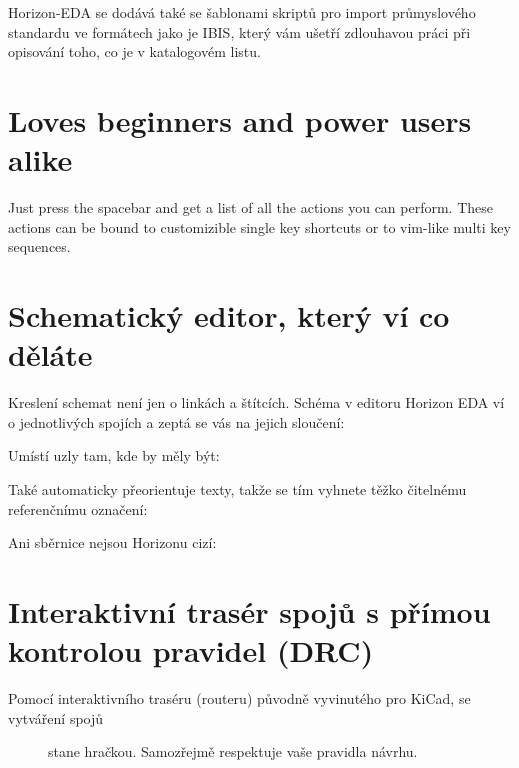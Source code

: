 \documentclass[letterpaper,10pt,czech]{sphinxmanual}
\begin{document}
\noindent{}

Horizon-EDA se dodává také se šablonami skriptů pro import průmyslového standardu
ve formátech jako je IBIS, který vám ušetří zdlouhavou práci při opisování toho, co je v katalogovém listu.


\section{Loves beginners and power users alike}
\label{\detokenize{feature-overview:loves-beginners-and-power-users-alike}}
Just press the spacebar and get a list of all the actions you can perform. These actions can be bound to customizible single key shortcuts or to vim-like multi key sequences.

\noindent{}


\section{Schematický editor, který ví co děláte}
\label{\detokenize{feature-overview:schematicky-editor-ktery-vi-co-delate}}
Kreslení schemat není jen o linkách a štítcích. Schéma v editoru Horizon EDA
ví o jednotlivých spojích a zeptá se vás na jejich sloučení:

\noindent{}

Umístí uzly tam, kde by měly být:

\noindent{}

Také automaticky přeorientuje texty, takže se tím vyhnete
těžko čitelnému referenčnímu označení:

\noindent{}

Ani sběrnice nejsou Horizonu cizí:

\noindent{}


\section{Interaktivní trasér spojů s přímou kontrolou pravidel (DRC)}
\label{\detokenize{feature-overview:interaktivni-traser-spoju-s-primou-kontrolou-pravidel-drc}}\begin{description}
\item[{Pomocí interaktivního traséru (routeru) původně vyvinutého pro KiCad, se vytváření spojů}] \leavevmode
stane hračkou. Samozřejmě respektuje vaše pravidla návrhu.

\end{description}
\end{document}

